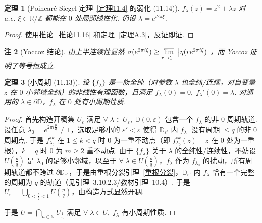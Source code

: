 \documentclass[11pt, a4paper, oneside]{ctexart}
\newtheorem{theorem}{定理}[section]
\newtheorem{remark}[theorem]{注}
\newcommand{\D}{\mathbb{D}}
\newcommand{\N}{\mathbb{N}}
\newcommand{\R}{\mathbb{R}}
\newcommand{\Z}{\mathbb{Z}}
\newcommand{\abs}[1]{\left|{#1}\right|}
\begin{document}
    \begin{theorem}[Poincaré-Siegel 定理~\ref{定理11.4} 的弱化 (11.14)]
        $f_{\lambda}(z)=z^2+\lambda z$ 对 a.e. $\xi\in \R/\Z$ 都能在 $0$ 处局部线性化. 仍设 $\lambda=e^{i 2\pi \xi}$.
    \end{theorem}
    \begin{proof}
        使用推论~\ref{推论11.16} 和定理~\ref{定理A.3}，反证即证.
    \end{proof}

    \begin{remark}[Yoccoz 结论]
        由上半连续性显然 $\sigma(e^{2\pi i\xi})\geq \varlimsup\limits_{r\to 1^-}\abs{\eta(re^{2\pi i\xi})}$，而 Yoccoz 证明了等号恒成立.
    \end{remark}
    
    \begin{theorem}[小周期 (11.13)]
        设 $\{f_{\lambda}\}$ 是一族全纯（对参数 $\lambda$ 也全纯/连续，对自变量 $z$ 在 $0$ 小邻域全纯）的非线性有理函数，且满足 $f_{\lambda}(0)=0,\; f_{\lambda}'(0)=\lambda$. 对通用的 $\lambda\in \partial\D$，$f_{\lambda}$ 在 $0$ 处有小周期性质.
    \end{theorem}
    \begin{proof}
        首先构造开稠集 $U_{\varepsilon}$ 满足 $\forall\; \lambda\in U_{\varepsilon},\; \D(0,\varepsilon)$ 包含一个 $f_{\lambda}$ 的非 $0$ 周期轨道. 设任意 $\lambda_0=e^{2\pi i\frac{p}{q}}\neq 1$，选取足够小的 $\varepsilon'<\varepsilon$ 使得 $\overline{\D_{\varepsilon'}}$ 内 $f_{\lambda_0}$ 没有周期 $\leq q$ 的非 $0$ 周期点. 于是 $f_{\lambda_0}^{\circ k}$ 在 $1\leq k<q$ 时 $0$ 为一重不动点（即 $f_{\lambda_0}^{\circ k}(z)-z$ 在 $0$ 处为一重根），$k=q$ 时 $0$ 为 $m\geq 2$ 重不动点. 由于 $\{f_{\lambda}\}$ 关于 $\lambda$ 的全纯性/连续性，不妨设 $U(\frac{p}{q})$ 是 $\lambda_0$ 的足够小邻域，以至于 $\forall\;\lambda\in U(\frac{p}{q})$，$f_{\lambda}$ 作为 $f_{\lambda_0}$ 的扰动，所有周期轨道都不跨过 $\partial \D_{\varepsilon'}$，于是由重根分裂引理~\ref{重根分裂}，$\D_{\varepsilon'}$ 内 $f_{\lambda}$ 恰有一个完整的周期为 $q$ 的轨道（见引理~3.10.2.3/教材引理~10.4）. 于是 $U_{\varepsilon}=\bigcup\limits_{0<\frac{p}{q}<1}U(\frac{p}{q})$，由构造方式显然开稠.

        于是 $U=\bigcap\limits_{n\in\N}U_{\frac{1}{n}}$ 满足 $\forall\;\lambda\in U,\; f_{\lambda}$ 有小周期性质.
    \end{proof}
\end{document}
